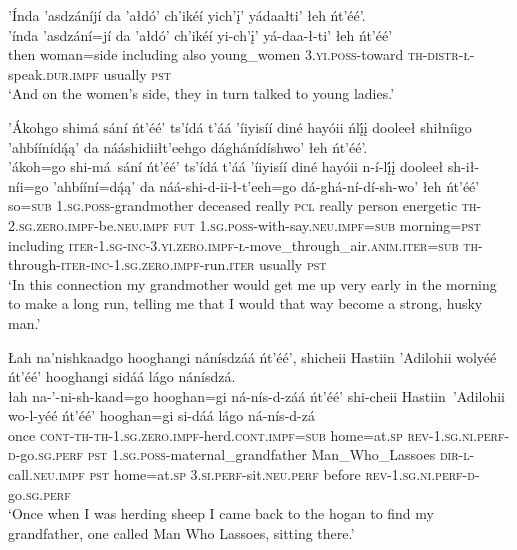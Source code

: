 \ea\label{ex:text2-1-4}
’Índa ’asdzáníjí da ’ałdó’ ch’ikéí yich’į’ yádaałti’ łeh ńt’éé’.\\
\gll ’índa	’asdzání=jí	da	’ałdó’	ch’ikéí	yi-ch’į’	yá-daa-ł-ti’	łeh	ńt’éé’\\
     then	woman=side	including	also	young\_women	3.\textsc{yi}.\textsc{poss}-toward	\textsc{th}-\textsc{distr}-\textsc{ł}-speak.\textsc{dur}.\textsc{impf}	usually	\textsc{pst}\\
\glt `And on the women's side, they in turn talked to young ladies.'
\z

\ea\label{ex:text2-2}
’Ákohgo shimá sání ńt’éé’ ts’ídá t’áá ’íiyisíí diné hayóii ńlį́į dooleeł shiłníigo ’ahbíínídą́ą’ da nááshidiiłt’eehgo dághánídíshwo’ łeh ńt’éé’.\\
\gll ’ákoh=go	shi-má~{sání}	ńt’éé’	ts’ídá	t’áá	’íiyisíí	diné	hayóii	n-í-lį́į	dooleeł	sh-ił-níi=go	’ahbííní=dą́ą’	da	náá-shi-d-ii-ł-t’eeh=go	dá-ghá-ní-dí-sh-wo’	łeh	ńt’éé’\\
     so=\textsc{sub}	1.\textsc{sg}.\textsc{poss}-grandmother	deceased	really	\textsc{pcl}	really	person	energetic	\textsc{th}-2.\textsc{sg}.\textsc{zero}.\textsc{impf}-be.\textsc{neu}.\textsc{impf}	\textsc{fut}	1.\textsc{sg}.\textsc{poss}-with-say.\textsc{neu}.\textsc{impf}=\textsc{sub}	morning=\textsc{pst}	including	\textsc{iter}-1.\textsc{sg}-\textsc{inc}-3.\textsc{yi}.\textsc{zero}.\textsc{impf}-\textsc{ł}-move\_through\_air.\textsc{anim}.\textsc{iter}=\textsc{sub}	\textsc{th}-through-\textsc{iter}-\textsc{inc}-1.\textsc{sg}.\textsc{zero}.\textsc{impf}-run.\textsc{iter}	usually	\textsc{pst}\\
\glt `In this connection my grandmother would get me up very early in the morning to make a long run, telling me that I would that way become a strong, husky man.'
\z

\ea\label{ex:text2-3-1}
Łah na’nishkaadgo hooghangi nánísdzáá ńt’éé’, shicheii Hastiin ’Adilohii wolyéé ńt’éé’ hooghangi sidáá lágo nánísdzá.\\
\gll łah	na-’-ni-sh-kaad=go	hooghan=gi	ná-nís-d-záá	ńt’éé’	shi-cheii	Hastiin~{’Adilohii}	wo-l-yéé	ńt’éé’	hooghan=gi	si-dáá	lágo	ná-nís-d-zá\\
     once	\textsc{cont}-\textsc{th}-\textsc{th}-1.\textsc{sg}.\textsc{zero}.\textsc{impf}-herd.\textsc{cont}.\textsc{impf}=\textsc{sub}	home=at.\textsc{sp}	\textsc{rev}-1.\textsc{sg}.\textsc{ni}.\textsc{perf}-\textsc{d}-go.\textsc{sg}.\textsc{perf}	\textsc{pst}	1.\textsc{sg}.\textsc{poss}-maternal\_grandfather	Man\_Who\_Lassoes	\textsc{dir}-\textsc{l}-call.\textsc{neu}.\textsc{impf}	\textsc{pst}	home=at.\textsc{sp}	3.\textsc{si}.\textsc{perf}-sit.\textsc{neu}.\textsc{perf}	before	\textsc{rev}-1.\textsc{sg}.\textsc{ni}.\textsc{perf}-\textsc{d}-go.\textsc{sg}.\textsc{perf}\\
\glt `Once when I was herding sheep I came back to the hogan to find my grandfather, one called Man Who Lassoes, sitting there.'
\z

